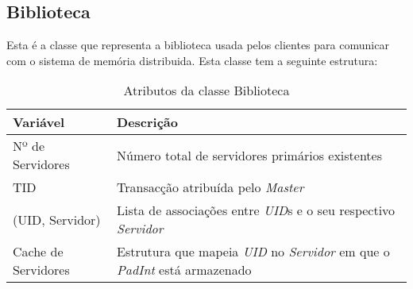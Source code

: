 \subsection{Biblioteca}
Esta é a classe que representa a biblioteca usada pelos clientes para comunicar com o sistema de memória distribuida. Esta classe tem a seguinte estrutura:

\begin{table}[H]
\centering
\begin{tabular}{| p{2cm} | p{5cm} |}
\hline
\textbf{Variável} & \textbf{Descrição} \\
\hline
Nº de Servidores & Número total de servidores primários existentes  \\
\hline
TID & Transacção atribuída pelo \textit{Master} \\
\hline
(UID, Servidor) & Lista de associações entre \textit{UID}s e o seu respectivo \textit{Servidor} \\
\hline
Cache de Servidores & Estrutura que mapeia \textit{UID} no \textit{Servidor} em que o \textit{PadInt} está armazenado \\
\hline
\end{tabular}
\caption{Atributos da classe Biblioteca} \label{lib}
\end{table}